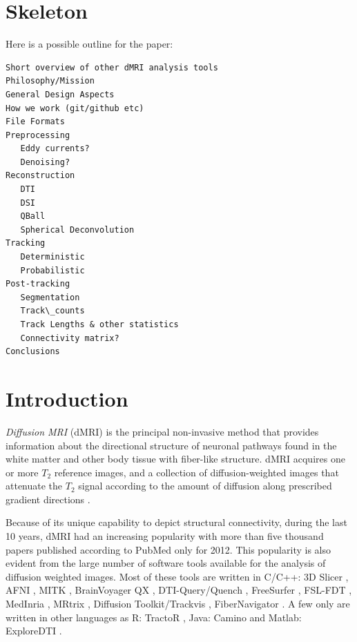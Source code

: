 \documentclass{bioinfo}
\begin{document}
\section{Skeleton}
Here is a possible outline for the paper:
\begin{verbatim}
Short overview of other dMRI analysis tools
Philosophy/Mission
General Design Aspects
How we work (git/github etc)
File Formats 
Preprocessing
   Eddy currents?
   Denoising?
Reconstruction
   DTI 
   DSI
   QBall
   Spherical Deconvolution 
Tracking
   Deterministic
   Probabilistic
Post-tracking
   Segmentation
   Track\_counts
   Track Lengths & other statistics
   Connectivity matrix?
Conclusions
\end{verbatim}

\section{Introduction}

\emph{Diffusion MRI} (dMRI) \citep{stejskal-tanner:65, lebihan-breton:85,merboldt-hanicke-etal:85, taylor-bushell:85, callaghan:91} is the principal non-invasive method that provides information about the directional structure of neuronal pathways found in the white matter and other body tissue with fiber-like structure. dMRI acquires one or 
more $T_{2}$ reference images, and a collection of diffusion-weighted images that attenuate the $T_{2}$ signal according to the amount of diffusion along prescribed gradient directions \citep{behrens-johansen-berg:09, jones:10}. 

Because of its unique capability to depict structural connectivity, during the last 10 years, dMRI had an increasing popularity with more than five thousand papers published according to PubMed only for 2012. This popularity is also evident from the large number of software tools available for the analysis of diffusion weighted images. Most of these tools are written in C/C++: 3D Slicer \citep{pieper:06}, AFNI \citep{cox-afni:12}, MITK \citep{fritzsche-mitk:12}, BrainVoyager QX \citep{goebel-brainvoyager:12}, DTI-Query/Quench \citep{sherbondy:05}, FreeSurfer \citep{fischl-freesurfer:12}, FSL-FDT \citep{smith-fdt:04}, MedInria \citep{toussaint-souplet-etal:07}, MRtrix \citep{Tournier2012}, Diffusion Toolkit/Trackvis \citep{wang-diffusion-toolkit:07}, FiberNavigator \citep{vaillancourt:11, chamberland:13}. A few only are written in other languages as R: TractoR \citep{ clayden-TractoR:11}, Java: Camino \citep{Cook2006} and Matlab: ExploreDTI \citep{leemans-exploredti:09}. 
\end{document}
